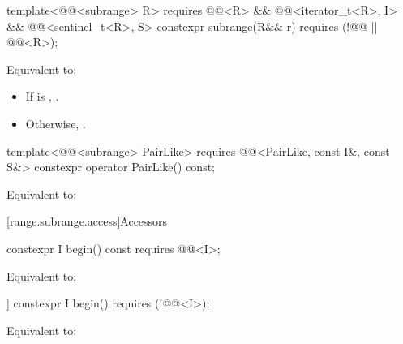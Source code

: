 %
\begin{itemdecl}
template<@@<subrange> R>
  requires @@<R> &&
           @@<iterator_t<R>, I> &&
           @@<sentinel_t<R>, S>
constexpr subrange(R&& r) requires (!@@ || @@<R>);
\end{itemdecl}

\begin{itemdescr}
\pnum
\effects
Equivalent to:
\begin{itemize}
\item If  is ,
.
\item Otherwise, .
\end{itemize}
\end{itemdescr}

%
\begin{itemdecl}
template<@@<subrange> PairLike>
  requires @@<PairLike, const I&, const S&>
constexpr operator PairLike() const;
\end{itemdecl}

\begin{itemdescr}
\pnum
\effects
Equivalent to: 
\end{itemdescr}

[range.subrange.access]{Accessors}

%
\begin{itemdecl}
constexpr I begin() const requires @@<I>;
\end{itemdecl}

\begin{itemdescr}
\pnum
\effects
Equivalent to: 
\end{itemdescr}

%
\begin{itemdecl}
[[nodiscard]] constexpr I begin() requires (!@@<I>);
\end{itemdecl}

\begin{itemdescr}
\pnum
\effects
Equivalent to: 
\end{itemdescr}

